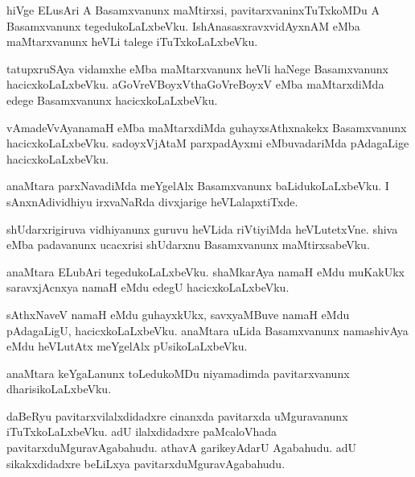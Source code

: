 \documentclass{article}
\begin{document}
\begin{mn}
hiVge  ELusAri  A  Basamxvanunx  maMtirxsi,  pavitarxvaninxTuTxkoMDu  A  Basamxvanunx  tegedukoLaLxbeVku.  
IshAnasasxravxvidAyxnAM  eMba  maMtarxvanunx  heVLi  talege  iTuTxkoLaLxbeVku.
\end{mn}

\begin{mn}
tatupxruSAya  vidamxhe  eMba  maMtarxvanunx  heVli  haNege  Basamxvanunx  hacicxkoLaLxbeVku.  
aGoVreVBoyxVthaGoVreBoyxV  eMba  maMtarxdiMda  edege  Basamxvanunx  hacicxkoLaLxbeVku.
\end{mn}

\begin{mn}
vAmadeVvAyanamaH  eMba  maMtarxdiMda  guhayxsAthxnakekx  Basamxvanunx  hacicxkoLaLxbeVku.  
sadoyxVjAtaM  parxpadAyxmi  eMbuvadariMda  pAdagaLige  hacicxkoLaLxbeVku.
\end{mn}

\begin{mn}
anaMtara  parxNavadiMda  meYgelAlx  Basamxvanunx  baLidukoLaLxbeVku.  I  sAnxnAdividhiyu  
irxvaNaRda  divxjarige  heVLalapxtiTxde.
\end{mn}

\begin{mn}
shUdarxrigiruva  vidhiyanunx  guruvu  heVLida  riVtiyiMda  heVLutetxVne.  shiva  eMba  padavanunx  
ucacxrisi  shUdarxnu  Basamxvanunx  maMtirxsabeVku.
\end{mn}

\begin{mn}
anaMtara  ELubAri  tegedukoLaLxbeVku.  shaMkarAya  namaH  eMdu  muKakUkx  saravxjAcnxya  namaH  
eMdu  edegU  hacicxkoLaLxbeVku.
\end{mn}

\begin{mn}
sAthxNaveV  namaH  eMdu  guhayxkUkx,  savxyaMBuve  namaH  eMdu  pAdagaLigU,  hacicxkoLaLxbeVku.  
anaMtara  uLida  Basamxvanunx  namashivAya  eMdu  heVLutAtx  meYgelAlx  pUsikoLaLxbeVku.
\end{mn}

\begin{mn}
anaMtara  keYgaLanunx  toLedukoMDu  niyamadimda  pavitarxvanunx  dharisikoLaLxbeVku.
\end{mn}

\begin{mn}
daBeRyu  pavitarxvilalxdidadxre  cinanxda  pavitarxda  uMguravanunx  iTuTxkoLaLxbeVku.  
adU  ilalxdidadxre  paMcaloVhada  pavitarxduMguravAgabahudu.  athavA  garikeyAdarU  
Agabahudu.  adU  sikakxdidadxre  beLiLxya  pavitarxduMguravAgabahudu.
\end{mn}
\end{document}
